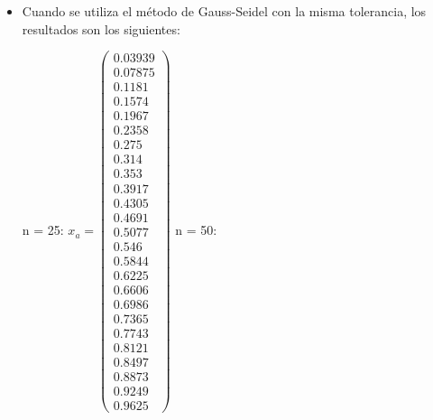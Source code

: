 \documentclass{udpreport}
\begin{document}
\begin{enumerate}
\begin{enumerate}
\begin{itemize}
				\item Cuando se utiliza el método de Gauss-Seidel con la misma tolerancia, los resultados son los siguientes:
				
				n = 25:
				$x_{a} = \left(\begin{array}{c} 0.03939\\ 0.07875\\ 0.1181\\ 0.1574\\ 0.1967\\ 0.2358\\ 0.275\\ 0.314\\ 0.353\\ 0.3917\\ 0.4305\\ 0.4691\\ 0.5077\\ 0.546\\ 0.5844\\ 0.6225\\ 0.6606\\ 0.6986\\ 0.7365\\ 0.7743\\ 0.8121\\ 0.8497\\ 0.8873\\ 0.9249\\ 0.9625 \end{array}\right)$
				n = 50:

\end{itemize}
\end{enumerate}
\end{enumerate}
\end{document}
